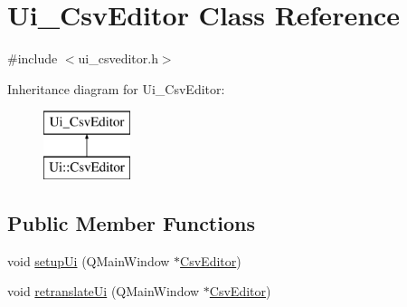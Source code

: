 \hypertarget{class_ui___csv_editor}{}\section{Ui\+\_\+\+Csv\+Editor Class Reference}
\label{class_ui___csv_editor}


{\ttfamily \#include $<$ui\+\_\+csveditor.\+h$>$}

Inheritance diagram for Ui\+\_\+\+Csv\+Editor\+:\begin{figure}[H]
\begin{center}
\leavevmode
\includegraphics[height=2.000000cm]{d4/de1/class_ui___csv_editor}
\end{center}
\end{figure}
\subsection*{Public Member Functions}
\begin{DoxyCompactItemize}
\item 
void \mbox{\hyperlink{class_ui___csv_editor_ad8ae324ce02bba98c60dbb7d59fbc739}{setup\+Ui}} (Q\+Main\+Window $\ast$\mbox{\hyperlink{class_csv_editor}{Csv\+Editor}})
\item 
void \mbox{\hyperlink{class_ui___csv_editor_ad24413d2ab738a4441dbb2ebd61c185a}{retranslate\+Ui}} (Q\+Main\+Window $\ast$\mbox{\hyperlink{class_csv_editor}{Csv\+Editor}})
\end{DoxyCompactItemize}
